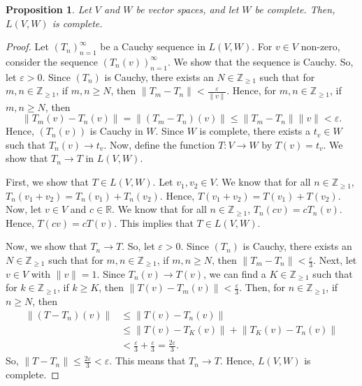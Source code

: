 \documentclass[a4paper, openany]{memoir}
\theoremstyle{definition}
\theoremstyle{plain}
\newtheorem{proposition}[definition]{Proposition}
\begin{document}
    \begin{proposition}
        Let $V$ and $W$ be vector spaces, and let $W$ be complete. Then, $L(V, W)$ is complete.
    \end{proposition}
    \begin{proof}
        Let $(T_n)_{n=1}^\infty$ be a Cauchy sequence in $L(V, W)$. For $v \in V$ non-zero, consider the sequence $(T_n(v))_{n=1}^\infty$. We show that the sequence is Cauchy. So, let $\varepsilon > 0$. Since $(T_n)$ is Cauchy, there exists an $N \in \mathbb{Z}_{\geq 1}$ such that for $m, n \in \mathbb{Z}_{\geq 1}$, if $m, n \geq N$, then $\lVert T_m - T_n \rVert < \frac{\varepsilon}{\lVert v \rVert}$. Hence, for $m, n \in \mathbb{Z}_{\geq 1}$, if $m, n \geq N$, then 
        \[\lVert T_m (v) - T_n (v)\rVert = \lVert (T_m - T_n)(v) \rVert \leq \lVert T_m - T_n \rVert \lVert v \rVert < \varepsilon.\]
        Hence, $(T_n(v))$ is Cauchy in $W$. Since $W$ is complete, there exists a $t_v \in W$ such that $T_n(v) \to t_v$. Now, define the function $T \colon V \to W$ by $T(v) = t_v$. We show that $T_n \to T$ in $L(V, W)$.

        First, we show that $T \in L(V, W)$. Let $v_1, v_2 \in V$. We know that for all $n \in \mathbb{Z}_{\geq 1}$, $T_n(v_1 + v_2) = T_n(v_1) + T_n(v_2)$. Hence, $T(v_1 + v_2) = T(v_1) + T(v_2)$. Now, let $v \in V$ and $c \in \mathbb{R}$. We know that for all $n \in \mathbb{Z}_{\geq 1}$, $T_n(cv) = cT_n(v)$. Hence, $T(cv) = cT(v)$. This implies that $T \in L(V, W)$.

        Now, we show that $T_n \to T$. So, let $\varepsilon > 0$. Since $(T_n)$ is Cauchy, there exists an $N \in \mathbb{Z}_{\geq 1}$ such that for $m, n \in \mathbb{Z}_{\geq 1}$, if $m, n \geq N$, then $\lVert T_m - T_n \rVert < \frac{\varepsilon}{3}$. Next, let $v \in V$ with $\lVert v \rVert = 1$. Since $T_n(v) \to T(v)$, we can find a $K \in \mathbb{Z}_{\geq 1}$ such that for $k \in \mathbb{Z}_{\geq 1}$, if $k \geq K$, then $\lVert T(v) - T_m(v) \rVert < \frac{\varepsilon}{3}$. Then, for $n \in \mathbb{Z}_{\geq 1}$, if $n \geq N$, then 
        \begin{align*}
            \lVert (T - T_n)(v) \rVert &\leq \lVert T(v) - T_n(v) \rVert \\
            &\leq \lVert T(v) - T_K(v) \rVert + \lVert T_K(v) - T_n(v) \rVert \\
            &< \frac{\varepsilon}{3} + \frac{\varepsilon}{3} = \frac{2\varepsilon}{3}.
        \end{align*}
        So, $\lVert T - T_n \rVert \leq \frac{2\varepsilon}{3} < \varepsilon$. This means that $T_n \to T$. Hence, $L(V, W)$ is complete.
    \end{proof}
\end{document}
